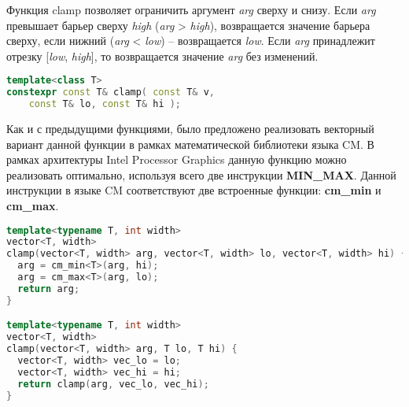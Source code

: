Функция clamp позволяет ограничить аргумент \textit{arg} сверху и снизу. 
Если \textit{arg} превышает барьер сверху \textit{high} (\textit{arg} > \textit{high}), возвращается значение барьера сверху, если нижний (\textit{arg} < \textit{low}) -- возвращается \textit{low}.
Если \textit{arg} принадлежит отрезку [\textit{low}, \textit{high}], то возвращается значение \textit{arg} без изменений.

\begin{lstlisting}[caption={Объявления шаблонной функции clamp согласно стандарту C++ 2017},captionpos=b,language=C++]
template<class T>
constexpr const T& clamp( const T& v,
    const T& lo, const T& hi );
\end{lstlisting}

Как и с предыдущими функциями, было предложено реализовать векторный вариант данной функции в рамках математической библиотеки языка CM.
В рамках архитектуры \foreignlanguage{english}{Intel Processor Graphics} данную функцию можно реализовать оптимально, используя всего две инструкции \textbf{MIN\_MAX}.
Данной инструкции в языке CM соответствуют две встроенные функции: \textbf{cm\_min} и \textbf{cm\_max}.

\begin{lstlisting}[caption={Объявления шаблонной функции clamp в математической библиотеке языка CM},captionpos=b,language=C++]
template<typename T, int width>
vector<T, width>
clamp(vector<T, width> arg, vector<T, width> lo, vector<T, width> hi) {
  arg = cm_min<T>(arg, hi);
  arg = cm_max<T>(arg, lo);
  return arg;
}

template<typename T, int width>
vector<T, width>
clamp(vector<T, width> arg, T lo, T hi) {
  vector<T, width> vec_lo = lo;
  vector<T, width> vec_hi = hi;
  return clamp(arg, vec_lo, vec_hi);
}
\end{lstlisting}

